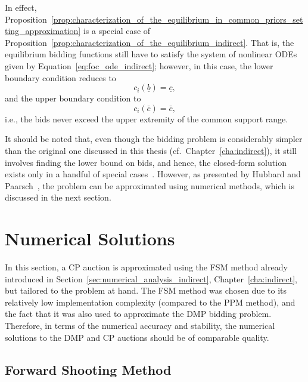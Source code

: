 In effect, Proposition~\ref{prop:characterization_of_the_equilibrium_in_common_priors_setting_approximation} is a special case of Proposition~\ref{prop:characterization_of_the_equilibrium_indirect}. That is, the equilibrium bidding functions still have to satisfy the system of nonlinear ODEs given by Equation~\eqref{eq:foc_ode_indirect}; however, in this case, the lower boundary condition reduces to
\begin{equation*}
  c_i(\underline{b}) = \underline{c},
\end{equation*}
and the upper boundary condition to
\begin{equation*}
  c_i(\bar{c}) = \bar{c},
\end{equation*}
i.e., the bids never exceed the upper extremity of the common support range.

It should be noted that, even though the bidding problem is considerably simpler than the original one discussed in this thesis (cf.~Chapter~\ref{cha:indirect}), it still involves finding the lower bound on bids, and hence, the closed-form solution exists only in a handful of special cases~\cite{Krishna10,HubbardPaarsch2011}. However, as presented by Hubbard and Paarsch~\cite{HubbardPaarsch2011}, the problem can be approximated using numerical methods, which is discussed in the next section.

\section{Numerical Solutions} %
\label{sec:numerical_solutions}
In this section, a CP auction is approximated using the FSM method already introduced in Section~\ref{sec:numerical_analysis_indirect}, Chapter~\ref{cha:indirect}, but tailored to the problem at hand. The FSM method was chosen due to its relatively low implementation complexity (compared to the PPM method), and the fact that it was also used to approximate the DMP bidding problem. Therefore, in terms of the numerical accuracy and stability, the numerical solutions to the DMP and CP auctions should be of comparable quality.

\subsection{Forward Shooting Method} %
\label{sub:forward_shooting_method}

